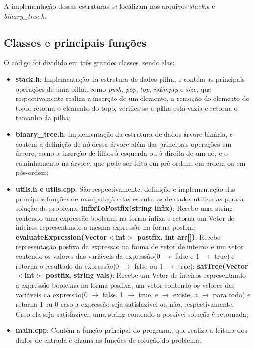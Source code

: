 \documentclass{article}
\begin{document}
A implementação dessas estruturas se localizam nos arquivos \textit{stack.h} e \textit{binary\_tree.h}.

\subsection{Classes e principais funções}
O código foi dividido em três grandes classes, sendo elas:
\begin{itemize}
    \item \textbf{stack.h}: Implementação da estrutura de dados pilha, e contém as principais operações de uma pilha, como \textit{push}, \textit{pop}, \textit{top}, \textit{isEmpty} e \textit{size}, que respectivamente realiza a inserção de um elemento, a remoção do elemento do topo, retorna o elemento do topo, verifica se a pilha está vazia e retorna o tamanho da pilha; 
    \item \textbf{binary\_tree.h}: Implementação da estrutura de dados árvore binária, e contém a definição de nó dessa árvore além das principais operações em árvore, como a inserção de filhos à esquerda ou à direita de um nó, e o caminhamento na árvore, que pode ser feito em pré-ordem, em ordem ou em pós-ordem;
    \item \textbf{utils.h e utils.cpp}: São respectivamente, definição e implementação das principais funções de manipulação das estruturas de dados utilizadas para a solução do problema.
        \subitem \textbf{infixToPostfix(string infix)}: Recebe uma string contendo uma expressão booleana na forma infixa e retorna um Vetor de inteiros representando a mesma expressão na forma posfixa;
        \subitem \textbf{evaluateExpression(Vector$<$int$>$ postfix, int arr[])}: Recebe representação posfixa da expressão na forma de vetor de inteiros e um vetor contendo os valores das variáveis da expressão(0 $\to$ false e 1 $\to$ true) e retorna o resultado da expressão(0 $\to$ false ou 1 $\to$ true);
        \subitem \textbf{satTree(Vector$<$int$>$ postfix, string vals)}: Recebe um Vetor de inteiros representando a expressão booleana na forma posfixa, um vetor contendo os valores das variáveis da expressão(0 $\to$ false, 1 $\to$ true, e $\to$ existe, a $\to$ para todo) e retorna 1 ou 0 caso a expressão seja satisfazível ou não, respectivamente. Caso ela seja satisfazível, uma string contendo a possível solução é retornada;
    \item \textbf{main.cpp}: Contém a função principal do programa, que realiza a leitura dos dados de entrada e chama as funções de solução do problema.   
\end{itemize}
\end{document}
